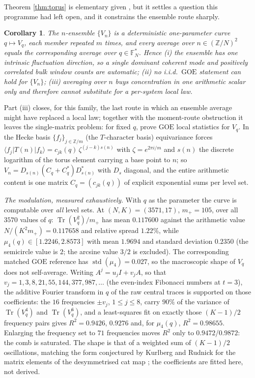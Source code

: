 \documentclass[11pt,reqno]{amsart}
\newtheorem{corollary}[theorem]{Corollary}
\theoremstyle{definition}
\newcommand{\FF}{\mathbb{F}}
\newcommand{\ZZ}{\mathbb{Z}}
\newcommand{\GOE}{\mathrm{GOE}}
\begin{document}
Theorem \ref{thm:torus} is elementary given \cite{KR2000}, but it settles a
question this programme had left open, and it constrains the ensemble route
sharply.

\begin{corollary}\label{cor:curve}
The $n$-ensemble $\{V_n\}$ is a deterministic one-parameter curve
$q\mapsto V_q$, each member repeated $m$ times, and every average over
$n\in(\ZZ/N)^2$ equals the corresponding average over $q\in\FF_N^{*}$.
Hence \textup{(i)} the ensemble has one intrinsic fluctuation direction, so a
single dominant coherent mode and positively correlated bulk window counts are
automatic; \textup{(ii)} no i.i.d.\ $\GOE$ statement can hold for $\{V_n\}$;
\textup{(iii)} averaging over $n$ buys concentration in one arithmetic scalar
only and therefore cannot substitute for a per-system local law.
\end{corollary}

Part \textup{(iii)} closes, for this family, the last route in which an
ensemble average might have replaced a local law; together with the
moment-route obstruction it leaves the single-matrix problem: for fixed $q$,
prove $\GOE$ local statistics for $V_q$.  In the Hecke basis $\{f_j\}_{j\in
\ZZ/m}$ (the $T$-character basis) equivariance forces
$\langle f_j|T(n)|f_k\rangle=c_{jk}(q)\,\zeta^{(j-k)s(n)}$ with
$\zeta=e^{2\pi i/m}$ and $s(n)$ the discrete logarithm of the torus element
carrying a base point to $n$; so
$V_n=D_{s(n)}(C_q+C_q^{*})D_{s(n)}^{*}$ with $D_s$ diagonal, and the entire
arithmetic content is one matrix $C_q=(c_{jk}(q))$ of explicit exponential
sums per level set.

\emph{The modulation, measured exhaustively.}  With $q$ as the parameter the
curve is computable over \emph{all} level sets.  At $(N,K)=(3571,17)$,
$m_+=105$, over all $3570$ values of $q$: $\operatorname{Tr}(V_q^2)/m_+$ has
mean $0.117600$ against the arithmetic value $N/(K^2m_+)=0.117658$ and
relative spread $1.22\%$, while
$\mu_4(q)\in[1.2246,2.8573]$ with mean $1.9694$ and standard deviation
$0.2350$ (the semicircle value is $2$; the arcsine value $3/2$ is excluded).
The corresponding matched $\GOE$ reference has $\operatorname{std}(\mu_4)
=0.027$, so the macroscopic shape of $V_q$ does not self-average.  Writing
$A^j=u_jI+v_jA$, so that $v_j=1,3,8,21,55,144,377,987,\dots$ (the even-index
Fibonacci numbers at $t=3$), the additive Fourier transform in $q$ of the raw
central traces is supported on those coefficients: the $16$ frequencies
$\pm v_j$, $1\le j\le 8$, carry $90\%$ of the variance of
$\operatorname{Tr}(V_q^4)$ and $\operatorname{Tr}(V_q^6)$, and a
least-squares fit on exactly those $(K-1)/2$ frequency pairs gives
$R^2=0.9426$, $0.9276$ and, for $\mu_4(q)$, $R^2=0.98655$.  Enlarging the
frequency set to $71$ frequencies moves $R^2$ only to $0.9472$/$0.9872$: the
comb is saturated.  The shape is that of a weighted sum of $(K-1)/2$
oscillations, matching the form conjectured by Kurlberg and Rudnick for the
matrix elements of the desymmetrised cat map \cite{KR2003}; the coefficients
are fitted here, not derived.
\end{document}
